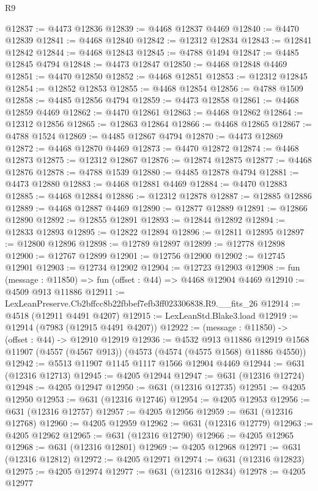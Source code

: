 \begin{lexlean}{R9}
\begin{coremodule}
@12837 := @4473 @12836
@12839 := @4468 @12837 @4469
@12840 := @4470 @12839
@12841 := @4468 @12840
@12842 := @12312 @12834
@12843 := @12841 @12842
@12844 := @4468 @12843
@12845 := @4788 @1494
@12847 := @4485 @12845 @4794
@12848 := @4473 @12847
@12850 := @4468 @12848 @4469
@12851 := @4470 @12850
@12852 := @4468 @12851
@12853 := @12312 @12845
@12854 := @12852 @12853
@12855 := @4468 @12854
@12856 := @4788 @1509
@12858 := @4485 @12856 @4794
@12859 := @4473 @12858
@12861 := @4468 @12859 @4469
@12862 := @4470 @12861
@12863 := @4468 @12862
@12864 := @12312 @12856
@12865 := @12863 @12864
@12866 := @4468 @12865
@12867 := @4788 @1524
@12869 := @4485 @12867 @4794
@12870 := @4473 @12869
@12872 := @4468 @12870 @4469
@12873 := @4470 @12872
@12874 := @4468 @12873
@12875 := @12312 @12867
@12876 := @12874 @12875
@12877 := @4468 @12876
@12878 := @4788 @1539
@12880 := @4485 @12878 @4794
@12881 := @4473 @12880
@12883 := @4468 @12881 @4469
@12884 := @4470 @12883
@12885 := @4468 @12884
@12886 := @12312 @12878
@12887 := @12885 @12886
@12889 := @4468 @12887 @4469
@12890 := @12877 @12889
@12891 := @12866 @12890
@12892 := @12855 @12891
@12893 := @12844 @12892
@12894 := @12833 @12893
@12895 := @12822 @12894
@12896 := @12811 @12895
@12897 := @12800 @12896
@12898 := @12789 @12897
@12899 := @12778 @12898
@12900 := @12767 @12899
@12901 := @12756 @12900
@12902 := @12745 @12901
@12903 := @12734 @12902
@12904 := @12723 @12903
@12908 := fun (message : @11850) => fun (offset : @44) => @4468 @12904 @4469
@12910 := @4509 @913 @11886
@12911 := LexLeanPreserve.Cb2bffcc8b22fbbef7efb3ff023306838.R9.__fits_26
@12914 := @4518 (@12911 @4491 @4207)
@12915 := LexLeanStd.Blake3.load
@12919 := @12914 (@7983 (@12915 @4491 @4207))
@12922 := (message : @11850) -> (offset : @44) -> @12910 @12919
@12936 := @4532
    @913
    @11886
    @12919
    @1568
    @11907
    (@4557 (@4567 @913))
    (@4573 (@4574 (@4575 @1568) @11886 @4550))
@12942 := @5513 @11907 @1145 @1117 @1566 @12904 @4469
@12944 := @631 (@12316 @12713)
@12945 := @4205 @12944
@12947 := @631 (@12316 @12724)
@12948 := @4205 @12947
@12950 := @631 (@12316 @12735)
@12951 := @4205 @12950
@12953 := @631 (@12316 @12746)
@12954 := @4205 @12953
@12956 := @631 (@12316 @12757)
@12957 := @4205 @12956
@12959 := @631 (@12316 @12768)
@12960 := @4205 @12959
@12962 := @631 (@12316 @12779)
@12963 := @4205 @12962
@12965 := @631 (@12316 @12790)
@12966 := @4205 @12965
@12968 := @631 (@12316 @12801)
@12969 := @4205 @12968
@12971 := @631 (@12316 @12812)
@12972 := @4205 @12971
@12974 := @631 (@12316 @12823)
@12975 := @4205 @12974
@12977 := @631 (@12316 @12834)
@12978 := @4205 @12977

\end{coremodule}
\end{lexlean}
